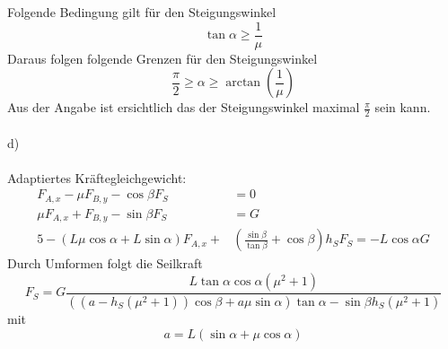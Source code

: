 Folgende Bedingung gilt für den Steigungswinkel
\[
	\tan\alpha \geq \frac{1}{\mu}
\]
Daraus folgen folgende Grenzen für den Steigungswinkel
\[
	\frac{\pi}{2} \geq \alpha \geq \arctan\left(\frac{1}{\mu}\right)
\]
Aus der Angabe ist ersichtlich das der Steigungswinkel maximal $\frac{\pi}{2}$ sein kann. \\ \\
d)\\ \\
Adaptiertes Kräftegleichgewicht:
\begin{align*}
	F_{A,x} - \mu F_{B,y} - \cos\beta F_S &= 0 \\
	\mu F_{A,x} + F_{B,y} - \sin\beta F_S &= G \\5
	-(L\mu \cos\alpha + L\sin\alpha)F_{A,x} + &\left(\frac{\sin\beta}{\tan\beta} + \cos\beta\right)h_S F_S = -L\cos\alpha G
\end{align*}
\newpage
\noindent
Durch Umformen folgt die Seilkraft
\[
	F_S = G \frac{L\tan\alpha \cos\alpha (\mu^2 + 1)}{((a - h_S(\mu^2 + 1))\cos\beta + a\mu\sin\alpha)\tan\alpha - \sin\beta h_S(\mu^2 + 1)}
\]
mit
\[
	a = L(\sin\alpha + \mu \cos\alpha)
\]